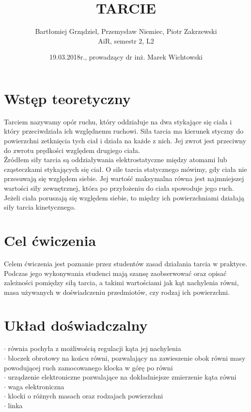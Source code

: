 \documentclass[11pt,a4paper]{article}
\title{TARCIE}
\author{Bartłomiej Grządziel, Przemysław Niemiec, Piotr Zakrzewski \\ AiR, semestr 2, L2}
\date{19.03.2018r., prowadzący dr inż. Marek Wichtowski}
\begin{document}
\maketitle


\section{Wstęp teoretyczny}
\hspace*{8mm} Tarciem nazywamy opór ruchu, który oddziałuje na dwa stykające się ciała i który przeciwdziała ich względnemu ruchowi. Siła tarcia ma kierunek styczny do powierzchni zetknięcia tych ciał i działa na każde z nich. Jej zwrot jest przeciwny do zwrotu prędkości względem drugiego ciała. \\
\hspace*{8mm} Źródłem siły tarcia są oddziaływania elektrostatyczne między atomami lub cząsteczkami stykających się ciał. O sile tarcia statycznego mówimy, gdy ciała nie przesuwają się względem siebie. Jej wartość maksymalna równa jest najmniejszej wartości siły zewnętrznej, która po przyłożeniu do ciała spowoduje jego ruch. Jeżeli ciała poruszają się względem siebie, to między ich powierzchniami działają siły tarcia kinetycznego.


\section{Cel ćwiczenia}
\hspace*{8mm} Celem ćwiczenia jest poznanie przez studentów zasad działania tarcia w praktyce. Podczas jego wykonywania studenci mają szansę zaobserwować oraz opisać zależności pomiędzy siłą tarcia, a takimi wartościami jak kąt nachylenia równi, masa używanych w doświadczeniu przedmiotów, czy rodzaj ich powierzchni.

\section{Układ doświadczalny}
$ \cdot $ równia pochyła z możliwością regulacji kąta jej nachylenia \\
$ \cdot $ bloczek obrotowy na końcu równi, pozwalający na zawieszenie obok równi masy powodującej ruch zamocowanego klocka w górę po równi \\
$ \cdot $ urządzenie elektroniczne pozwalające na dokładniejsze zmierzenie kąta równi \\
$ \cdot $ waga elektroniczna \\
$ \cdot $ klocki o różnych masach oraz rodzajach powierzchni \\
$ \cdot $ linka
\pagebreak
\end{document}
